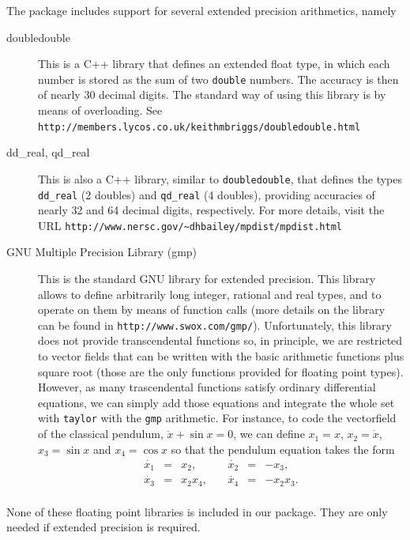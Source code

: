 \documentclass[12pt,twoside]{article}
\begin{document}
The package includes support for several extended precision
arithmetics, namely
\begin{description}
\item[doubledouble] This is a C++ library that defines an extended
  float type, in which each number is stored as the sum of two
  \texttt{double} numbers. The accuracy is then of nearly 30 decimal
  digits. The standard way of using this library is by means of
  overloading. See
  \verb-http://members.lycos.co.uk/keithmbriggs/doubledouble.html-

\item[dd\_real, qd\_real] This is also a C++ library, similar to
  \texttt{doubledouble}, that defines the types \texttt{dd\_real} (2
  doubles) and \texttt{qd\_real} (4 doubles), providing accuracies of
  nearly 32 and 64 decimal digits, respectively. For more details,
  visit the URL
  \verb-http://www.nersc.gov/~dhbailey/mpdist/mpdist.html-
  
\item[GNU Multiple Precision Library (gmp)] This is the standard GNU
  library for extended precision. This library allows to define
  arbitrarily long integer, rational and real types, and to operate on
  them by means of function calls (more details on the library can be
  found in \verb-http://www.swox.com/gmp/-). Unfortunately, this
  library does not provide transcendental functions so, in principle,
  we are restricted to vector fields that can be written with the
  basic arithmetic functions plus square root (those are the only
  functions provided for floating point types). However, as many
  trascendental functions satisfy ordinary differential equations, we
  can simply add those equations and integrate the whole set with
  \texttt{taylor} with the \texttt{gmp} arithmetic. For instance, to
  code the vectorfield of the classical pendulum, $\ddot{x}+\sin x=0$,
  we can define $x_1=x$, $x_2=\dot{x}$, $x_3=\sin x$ and $x_4=\cos x$
  so that the pendulum equation takes the form
  \[
  \begin{array}{rclrcl}
  \dot{x_1} & = & x_2,\qquad     & \dot{x_2} & = & -x_3,\\
  \dot{x_3} & = & x_2 x_4, & \dot{x_4} & = & -x_2x_3.\\
  \end{array}
  \]

\end{description}
None of these floating point libraries is included in our package.
They are only needed if extended precision is required.
\end{document}
